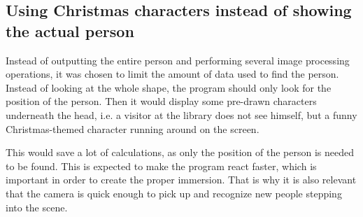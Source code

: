 
\subsection{Using Christmas characters instead of showing the actual person}
Instead of outputting the entire person and performing several image processing operations, it was chosen to limit the amount of data used to find the person. Instead of looking at the whole shape, the program should only look for the position of the person. Then it would display some pre-drawn characters underneath the head, i.e. a visitor at the library does not see himself, but a funny Christmas-themed character running around on the screen.

This would save a lot of calculations, as only the position of the person is needed to be found. This is expected to make the program react faster, which is important in order to create the proper immersion. That is why it is also relevant that the camera is quick enough to pick up and recognize new people stepping into the scene.
 